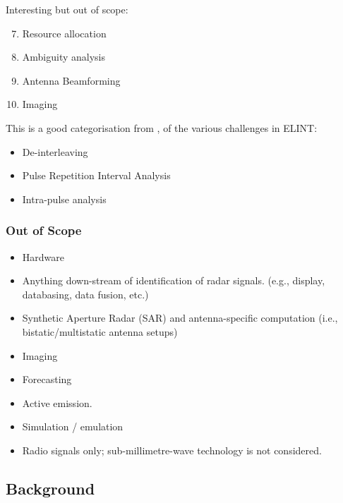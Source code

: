 Interesting but out of scope:
\begin{enumerate}
  \setcounter{enumi}{6}
    \item Resource allocation
    \item Ambiguity analysis
    \item Antenna Beamforming
    \item Imaging
\end{enumerate}

This is a good categorisation from \cite{wiley_elint_2006}, of the various challenges in ELINT:

\begin{itemize}
    \item De-interleaving
    \item Pulse Repetition Interval Analysis
    \item Intra-pulse analysis
\end{itemize}

\subsubsection{Out of Scope}

\begin{itemize}
    \item Hardware
    \item Anything down-stream of identification of radar signals. (e.g., display, databasing, data fusion, etc.)
    \item Synthetic Aperture Radar (SAR) and antenna-specific computation (i.e., bistatic/multistatic antenna setups)
    \item Imaging
    \item Forecasting
    \item Active emission.
    \item Simulation / emulation
    \item Radio signals only; sub-millimetre-wave technology is not considered.
\end{itemize}

\subsection{Background}

